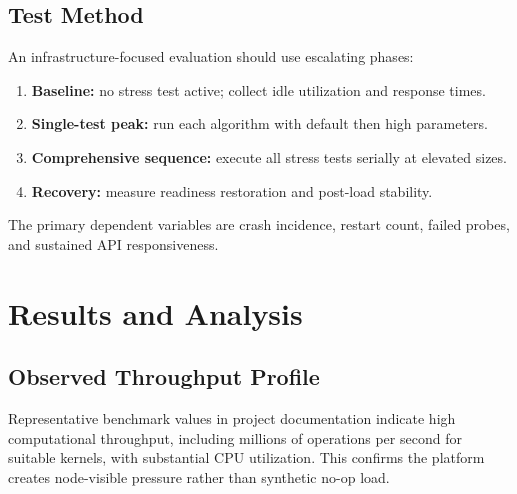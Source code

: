 \documentclass[11pt,a4paper]{article}
\begin{document}
\subsection{Test Method}
An infrastructure-focused evaluation should use escalating phases:

\begin{enumerate}[leftmargin=1.5em]
	\item \textbf{Baseline:} no stress test active; collect idle utilization and response times.
	\item \textbf{Single-test peak:} run each algorithm with default then high parameters.
	\item \textbf{Comprehensive sequence:} execute all stress tests serially at elevated sizes.
	\item \textbf{Recovery:} measure readiness restoration and post-load stability.
\end{enumerate}

The primary dependent variables are crash incidence, restart count, failed probes, and sustained API responsiveness.

\section{Results and Analysis}

\subsection{Observed Throughput Profile}
Representative benchmark values in project documentation indicate high computational throughput, including millions of operations per second for suitable kernels, with substantial CPU utilization. This confirms the platform creates node-visible pressure rather than synthetic no-op load.
\end{document}
